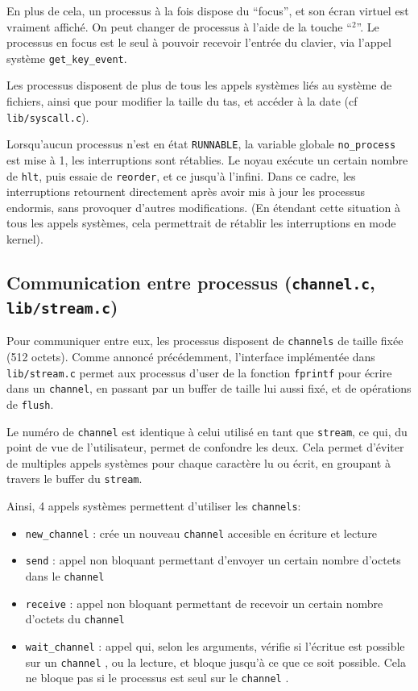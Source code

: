 \documentclass[a4paper,10pt, french]{article}
\newcommand{\code}[1]{\texttt{#1}}
\newcommand{\chan}{\texttt{channel} }
\begin{document}
En plus de cela, un processus à la fois dispose du ``focus'', et son écran virtuel est vraiment affiché.
On peut changer de processus à l'aide de la touche ``$^2$''. Le processus en focus est le seul à pouvoir 
recevoir l'entrée du clavier, via l'appel système \code{get\_key\_event}.

Les processus disposent de plus de tous les appels systèmes liés au système de fichiers, ainsi que pour 
modifier la taille du tas, et accéder à la date (cf \code{lib/syscall.c}).

Lorsqu'aucun processus n'est en état \code{RUNNABLE}, la variable globale \code{no\_process} est mise à 1,
les interruptions sont rétablies. Le noyau exécute un certain nombre de \code{hlt}, puis essaie de \code{reorder},
et ce jusqu'à l'infini. Dans ce cadre, les interruptions retournent directement après avoir mis à jour les processus endormis, sans provoquer
d'autres modifications. (En étendant cette situation à tous les appels systèmes, cela 
permettrait de rétablir les interruptions en mode kernel).

\subsection{Communication entre processus (\code{channel.c}, \code{lib/stream.c})}
Pour communiquer entre eux, les processus disposent de \code{channels} de taille fixée (512 octets).
Comme annoncé précédemment, l'interface implémentée dans \code{lib/stream.c} permet aux processus 
d'user de la fonction \code{fprintf} pour écrire dans un \code{channel}, en passant par un buffer de taille lui aussi fixé,
et de opérations de \code{flush}.

Le numéro de \code{channel} est identique à celui utilisé en tant que \code{stream}, ce qui, du point de vue de l'utilisateur,
permet de confondre les deux. Cela permet d'éviter de multiples appels systèmes pour chaque caractère lu ou écrit, en groupant 
à travers le buffer du \code{stream}.

Ainsi, 4 appels systèmes permettent d'utiliser les \code{channels}:
\begin{itemize}
 \item \code{new\_channel} : crée un nouveau \code{channel} accesible en écriture et lecture
 \item \code{send} : appel non bloquant permettant d'envoyer un certain nombre d'octets dans le \chan
 \item \code{receive} : appel non bloquant permettant de recevoir un certain nombre d'octets du \chan
 \item \code{wait\_channel} : appel qui, selon les arguments, vérifie si l'écritue est possible sur un \chan, ou la lecture,
 et bloque jusqu'à ce que ce soit possible. Cela ne bloque pas si le processus est seul sur le \chan.
\end{itemize}
\end{document}
